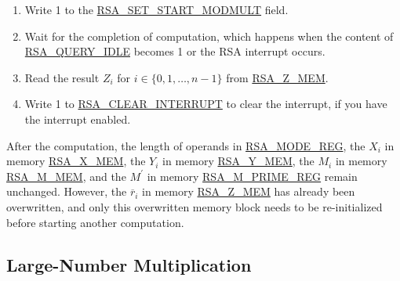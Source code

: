 \documentclass[main\_\_EN.tex]{subfiles}
\begin{document}
\begin{enumerate}
        Users need to write data to each memory block only according to the length of the number; data beyond this length are ignored.

    \item Write 1 to the \hyperref[fielddesc:RSASETSTARTMODMULT]{RSA\_SET\_START\_MODMULT} field.

    \item Wait for the completion of computation, which happens when the content of \hyperref[fielddesc:RSAQUERYIDLE]{RSA\_QUERY\_IDLE} becomes 1 or the RSA interrupt occurs.

    \item Read the result \begin{math}Z_{i}\end{math} for \begin{math}i \in \{ 0, 1, \dots, n-1 \} \end{math} from \hyperref[regdesc:RSAmemory]{RSA\_Z\_MEM}.
    \item Write 1 to \hyperref[fielddesc:RSACLEARINTERRUPT]{RSA\_CLEAR\_INTERRUPT} to clear the interrupt, if you have the interrupt enabled.

\end{enumerate}

After the computation, the length of operands in \hyperref[regdesc:RSAMODEREG]{RSA\_MODE\_REG}, the \begin{math}X_{i}\end{math} in memory \hyperref[regdesc:RSAmemory]{RSA\_X\_MEM}, the \begin{math}Y_{i}\end{math} in memory \hyperref[regdesc:RSAmemory]{RSA\_Y\_MEM}, the \begin{math}M_{i}\end{math} in memory \hyperref[regdesc:RSAmemory]{RSA\_M\_MEM}, and the \begin{math}M^{\prime}\end{math} in memory \hyperref[regdesc:RSAMPRIMEREG]{RSA\_M\_PRIME\_REG} remain unchanged. However, the \begin{math}\overline{r}_{i}\end{math} in memory \hyperref[regdesc:RSAmemory]{RSA\_Z\_MEM} has already been overwritten, and only this overwritten memory block needs to be re-initialized before starting another computation.

\subsection{Large-Number Multiplication}
\end{document}
